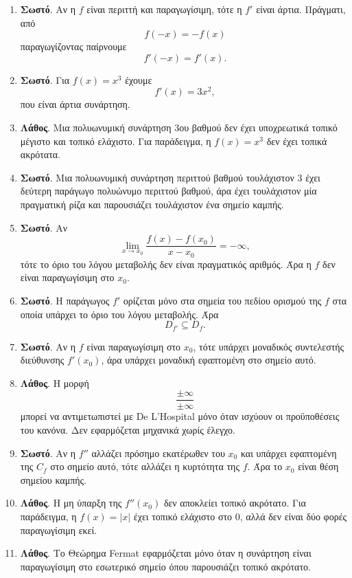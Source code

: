 \begin{enumerate}[label=\textbf{2.\arabic*.}]
\item \textbf{Σωστό}. Αν η $f$ είναι περιττή και παραγωγίσιμη, τότε η $f'$ είναι άρτια. Πράγματι, από
\[
f(-x)=-f(x)
\]
παραγωγίζοντας παίρνουμε
\[
f'(-x)=f'(x).
\]

\item \textbf{Σωστό}. Για $f(x)=x^3$ έχουμε
\[
f'(x)=3x^2,
\]
που είναι άρτια συνάρτηση.

\item \textbf{Λάθος}. Μια πολυωνυμική συνάρτηση 3ου βαθμού δεν έχει υποχρεωτικά τοπικό μέγιστο και τοπικό ελάχιστο. Για παράδειγμα, η $f(x)=x^3$ δεν έχει τοπικά ακρότατα.

\item \textbf{Σωστό}. Μια πολυωνυμική συνάρτηση περιττού βαθμού τουλάχιστον $3$ έχει δεύτερη παράγωγο πολυώνυμο περιττού βαθμού, άρα έχει τουλάχιστον μία πραγματική ρίζα και παρουσιάζει τουλάχιστον ένα σημείο καμπής.

\item \textbf{Σωστό}. Αν
\[
\lim_{x\to x_0}\frac{f(x)-f(x_0)}{x-x_0}=-\infty,
\]
τότε το όριο του λόγου μεταβολής δεν είναι πραγματικός αριθμός. Άρα η $f$ δεν είναι παραγωγίσιμη στο $x_0$.

\item \textbf{Σωστό}. Η παράγωγος $f'$ ορίζεται μόνο στα σημεία του πεδίου ορισμού της $f$ στα οποία υπάρχει το όριο του λόγου μεταβολής. Άρα
\[
D_{f'}\subseteq D_f.
\]

\item \textbf{Σωστό}. Αν η $f$ είναι παραγωγίσιμη στο $x_0$, τότε υπάρχει μοναδικός συντελεστής διεύθυνσης $f'(x_0)$, άρα υπάρχει μοναδική εφαπτομένη στο σημείο αυτό.

\item \textbf{Λάθος}. Η μορφή
\[
\frac{\pm\infty}{\pm\infty}
\]
μπορεί να αντιμετωπιστεί με De L'Hospital μόνο όταν ισχύουν οι προϋποθέσεις του κανόνα. Δεν εφαρμόζεται μηχανικά χωρίς έλεγχο.

\item \textbf{Σωστό}. Αν η $f''$ αλλάζει πρόσημο εκατέρωθεν του $x_0$ και υπάρχει εφαπτομένη της $C_f$ στο σημείο αυτό, τότε αλλάζει η κυρτότητα της $f$. Άρα το $x_0$ είναι θέση σημείου καμπής.

\item \textbf{Λάθος}. Η μη ύπαρξη της $f''(x_0)$ δεν αποκλείει τοπικό ακρότατο. Για παράδειγμα, η $f(x)=|x|$ έχει τοπικό ελάχιστο στο $0$, αλλά δεν είναι δύο φορές παραγωγίσιμη εκεί.

\item \textbf{Λάθος}. Το Θεώρημα Fermat εφαρμόζεται μόνο όταν η συνάρτηση είναι παραγωγίσιμη στο εσωτερικό σημείο όπου παρουσιάζει τοπικό ακρότατο.


\end{enumerate}
